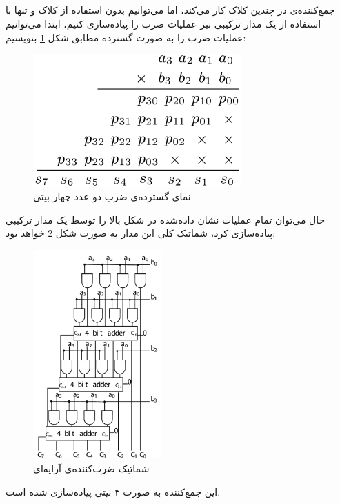 \documentclass{article}
\begin{document}
\subsection{}
جمع‌کننده‌ی  در چندین کلاک کار می‌کند، اما می‌توانیم بدون استفاده از کلاک و تنها با استفاده از یک مدار ترکیبی نیز عملیات ضرب را پیاده‌سازی کنیم، ابتدا می‌توانیم عملیات ضرب را به صورت گسترده مطابق شکل \ref{fig:array_multiplication} بنویسیم:
\begin{figure}[H]
\centering
\includegraphics[width=8cm]{array_multiplication}
\caption{نمای گسترده‌ی ضرب دو عدد چهار بیتی}
\label{fig:array_multiplication}
\end{figure}
حال می‌توان تمام عملیات نشان داده‌شده در شکل بالا را توسط یک مدار ترکیبی پیاده‌سازی کرد، شماتیک کلی این مدار به صورت شکل \ref{fig:4-bit-array-multiplier} خواهد بود:
\begin{figure}[H]
\centering
\includegraphics[height=8cm]{4-bit-array-multiplier}
\caption{شماتیک ضرب‌کننده‌ی آرایه‌ای}
\label{fig:4-bit-array-multiplier}
\end{figure}
این جمع‌کننده به صورت ۴ بیتی پیاده‌سازی شده است.

\subsection{}
\end{document}

